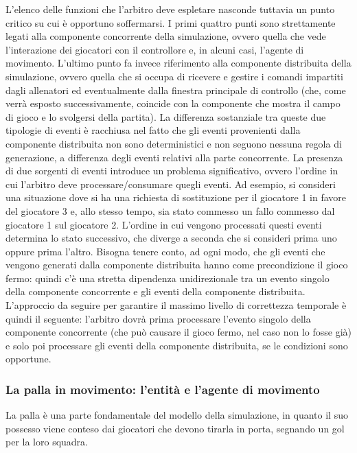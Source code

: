 L'elenco delle funzioni che l'arbitro deve espletare nasconde tuttavia un punto critico su cui è opportuno soffermarsi. I primi quattro punti sono strettamente legati alla componente concorrente della simulazione, ovvero quella che vede l'interazione dei giocatori con il controllore e, in alcuni casi, l'agente di movimento. L'ultimo punto fa invece riferimento alla componente distribuita della simulazione, ovvero quella che si occupa di ricevere e gestire i comandi impartiti dagli allenatori ed eventualmente dalla finestra principale di controllo (che, come verrà esposto successivamente, coincide con la componente che mostra il campo di gioco e lo svolgersi della partita). La differenza sostanziale tra queste due tipologie di eventi è racchiusa nel fatto che gli eventi provenienti dalla componente distribuita non sono deterministici e non seguono nessuna regola di generazione, a differenza degli eventi relativi alla parte concorrente.
La presenza di due sorgenti di eventi introduce un problema significativo, ovvero l'ordine in cui l'arbitro deve processare/consumare quegli eventi. Ad esempio, si consideri una situazione dove si ha una richiesta di sostituzione per il giocatore 1 in favore del giocatore 3 e, allo stesso tempo, sia stato commesso un fallo commesso dal giocatore 1 sul giocatore 2. L'ordine in cui vengono processati questi eventi determina lo stato successivo, che diverge a seconda che si consideri prima uno oppure prima l'altro. Bisogna tenere conto, ad ogni modo, che gli eventi che vengono generati dalla componente distribuita hanno come precondizione il gioco fermo: quindi c'è una stretta dipendenza unidirezionale tra un evento singolo della componente concorrente e gli eventi della componente distribuita. L'approccio da seguire per garantire il massimo livello di correttezza temporale è quindi il seguente: l'arbitro dovrà prima processare l'evento singolo della componente concorrente (che può causare il gioco fermo, nel caso non lo fosse già) e solo poi processare gli eventi della componente distribuita, se le condizioni sono opportune.

\subsubsection{La palla in movimento: l'entità e l'agente di movimento}
\label{sec:modello_palla_agente_movimento}


La palla è una parte fondamentale del modello della simulazione, in quanto il suo possesso viene conteso dai giocatori che devono tirarla in porta, segnando un gol per la loro squadra. 


